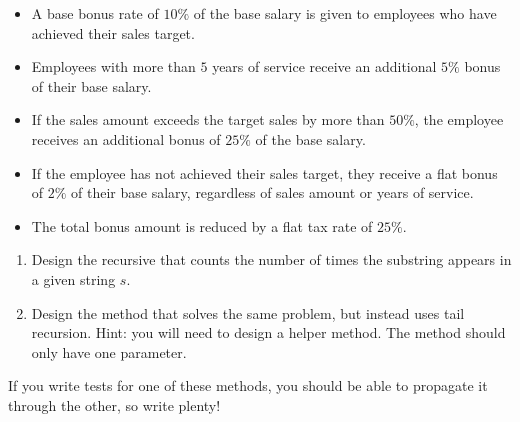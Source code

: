 \begin{itemize}
    \item A base bonus rate of $10\%$ of the base salary is given to employees who have achieved their sales target.
    \item Employees with more than $5$ years of service receive an additional $5\%$ bonus of their base salary.
    \item If the sales amount exceeds the target sales by more than $50\%$, the employee receives an additional bonus of $25\%$ of the base salary.
    \item If the employee has not achieved their sales target, they receive a flat bonus of $2\%$ of their base salary, regardless of sales amount or years of service.
    \item The total bonus amount is reduced by a flat tax rate of $25\%$.
\end{itemize}


\begin{enumerate}[label=(\alph*)]
    \item Design the recursive  that counts the number of times the substring  appears in a given string $s$.
    \item Design the  method that solves the same problem, but instead uses tail recursion. Hint: you will need to design a  helper method. The  method should only have one parameter.
\end{enumerate}
If you write tests for one of these methods, you should be able to propagate it through the other, so write plenty!

